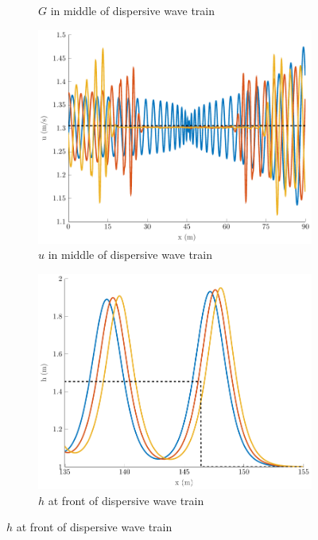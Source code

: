 \documentclass[10pt]{elsarticle}
\begin{document}
\begin{figure}
\begin{subfigure}{0.32\textwidth}
		\caption{$G$ in middle of dispersive wave train}
	\end{subfigure}
	\begin{subfigure}{0.32\textwidth}
		\centering
		\includegraphics[width=\textwidth]{./Figures/Simulations/Study/ImpDisp/uMiddle.pdf}
		\caption{$u$ in middle of dispersive wave train}
	\end{subfigure}
	\begin{subfigure}{0.32\textwidth}
		\centering
		\includegraphics[width=\textwidth]{./Figures/Simulations/Study/ImpDisp/hFront.pdf}
		\caption{$h$ at front of dispersive wave train}
	\end{subfigure}

\end{figure}
\end{document}
